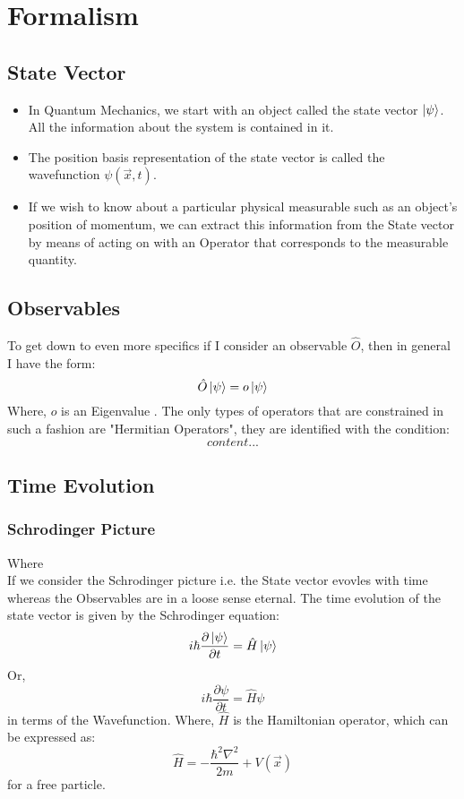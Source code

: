 \chapter{Formalism}
\section{State Vector}
\begin{itemize}
\item In Quantum Mechanics, we start with an object called the state vector $\ket{\psi}$. All the information about the system is contained in it. 
\item The position basis representation of the state vector is called the wavefunction $\psi (\vec{x}, t)$.
\item If we wish to know about a particular physical measurable such as an object's position of momentum, we can extract this information from the State vector by means of acting on with an Operator that corresponds to the measurable quantity.
\end{itemize}

\section{Observables}
To get down to even more specifics if I consider an observable $\hat{O}$, then in general I have the form:
\begin{equation}
	\hat{O} \ket{\psi} = o \ket{\psi}
\end{equation}
Where, $o$ is an Eigenvalue . The only types of operators that are constrained in such a fashion are "Hermitian Operators", they are identified with the condition:
\begin{equation}
	content...
\end{equation}
\section{Time Evolution}
\subsection{Schrodinger Picture}
Where\\
If we consider the Schrodinger picture i.e. the State vector evovles with time whereas the Observables are in a loose sense eternal. The time evolution of the state vector is given by the Schrodinger equation:
\begin{equation}
	i \hbar \frac{\partial \ket{\psi}}{\partial t} = \hat{H} \ket{\psi}
\end{equation}
Or,
\begin{equation}
	i \hbar \frac{\partial \psi}{\partial t} = \hat{H} \psi
\end{equation}
in terms of the Wavefunction. Where, $\hat{H}$ is the Hamiltonian operator, which can be expressed as:
\begin{equation}
	\hat{H} = -\frac{\hbar^{2} \nabla^2}{2m} + V(\vec{x})
\end{equation}
for a free particle. 
